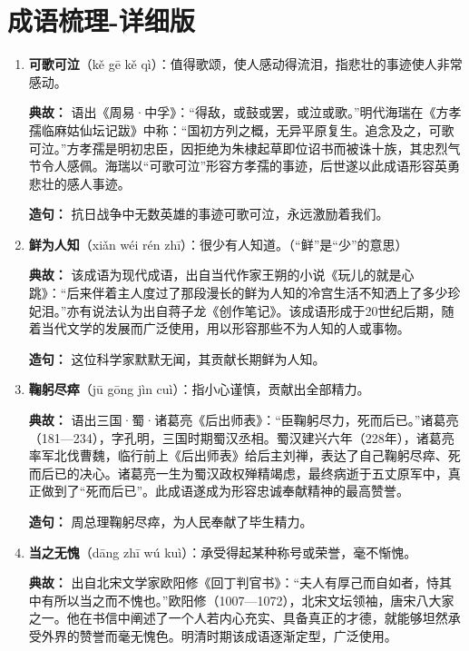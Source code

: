 \chapter{成语梳理-详细版}


\begin{enumerate}[leftmargin=*]

    \item \textbf{可歌可泣}（kě gē kě qì）：值得歌颂，使人感动得流泪，指悲壮的事迹使人非常感动。
    
    \textbf{典故：} 语出《周易·中孚》：“得敌，或鼓或罢，或泣或歌。”明代海瑞在《方孝孺临麻姑仙坛记跋》中称：“国初方列之概，无异平原复生。追念及之，可歌可泣。”方孝孺是明初忠臣，因拒绝为朱棣起草即位诏书而被诛十族，其忠烈气节令人感佩。海瑞以“可歌可泣”形容方孝孺的事迹，后世遂以此成语形容英勇悲壮的感人事迹。
    
    \textbf{造句：} 抗日战争中无数英雄的事迹可歌可泣，永远激励着我们。

    \item \textbf{鲜为人知}（xiǎn wéi rén zhī）：很少有人知道。（“鲜”是“少”的意思）
    
    \textbf{典故：} 该成语为现代成语，出自当代作家王朔的小说《玩儿的就是心跳》：“后来伴着主人度过了那段漫长的鲜为人知的冷宫生活不知洒上了多少珍妃泪。”亦有说法认为出自蒋子龙《创作笔记》。该成语形成于20世纪后期，随着当代文学的发展而广泛使用，用以形容那些不为人知的人或事物。
    
    \textbf{造句：} 这位科学家默默无闻，其贡献长期鲜为人知。

    \item \textbf{鞠躬尽瘁}（jū gōng jìn cuì）：指小心谨慎，贡献出全部精力。
    
    \textbf{典故：} 语出三国·蜀·诸葛亮《后出师表》：“臣鞠躬尽力，死而后已。”诸葛亮（181—234），字孔明，三国时期蜀汉丞相。蜀汉建兴六年（228年），诸葛亮率军北伐曹魏，临行前上《后出师表》给后主刘禅，表达了自己鞠躬尽瘁、死而后已的决心。诸葛亮一生为蜀汉政权殚精竭虑，最终病逝于五丈原军中，真正做到了“死而后已”。此成语遂成为形容忠诚奉献精神的最高赞誉。
    
    \textbf{造句：} 周总理鞠躬尽瘁，为人民奉献了毕生精力。

    \item \textbf{当之无愧}（dāng zhī wú kuì）：承受得起某种称号或荣誉，毫不惭愧。
    
    \textbf{典故：} 出自北宋文学家欧阳修《回丁判官书》：“夫人有厚己而自如者，恃其中有所以当之而不愧也。”欧阳修（1007—1072），北宋文坛领袖，唐宋八大家之一。他在书信中阐述了一个人若内心充实、具备真正的才德，就能够坦然承受外界的赞誉而毫无愧色。明清时期该成语逐渐定型，广泛使用。
    

\end{enumerate}
